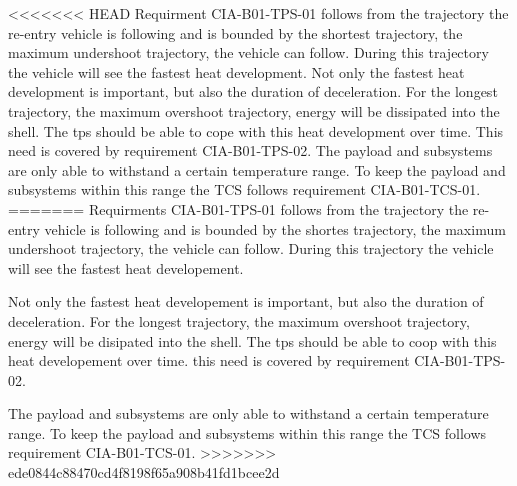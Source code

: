 <<<<<<< HEAD
Requirment CIA-B01-TPS-01 follows from the trajectory the re-entry vehicle is following and is bounded by the shortest trajectory, the maximum undershoot trajectory, the vehicle can follow. During this trajectory the vehicle will see the fastest heat development. Not only the fastest heat development is important, but also the duration of deceleration. For the longest trajectory, the maximum overshoot trajectory, energy will be dissipated into the shell. The \gls{tps} should be able to cope with this heat development over time. This need is covered by requirement CIA-B01-TPS-02. The payload and subsystems are only able to withstand a certain temperature range. To keep the payload and subsystems within this range the TCS follows requirement CIA-B01-TCS-01. 
=======
Requirments CIA-B01-TPS-01 follows from the trajectory the re-entry vehicle is following and is bounded by the shortes trajectory, the maximum undershoot trajectory, the vehicle can follow. During this trajectory the vehicle will see the fastest heat developement.

Not only the fastest heat developement is important, but also the duration of deceleration. For the longest trajectory, the maximum overshoot trajectory, energy will be disipated into the shell. The \gls{tps} should be able to coop with this heat developement over time. this need is covered by requirement CIA-B01-TPS-02.

The payload and subsystems are only able to withstand a certain temperature range. To keep the payload and subsystems within this range the TCS follows requirement CIA-B01-TCS-01.
>>>>>>> ede0844c88470cd4f8198f65a908b41fd1bcee2d

